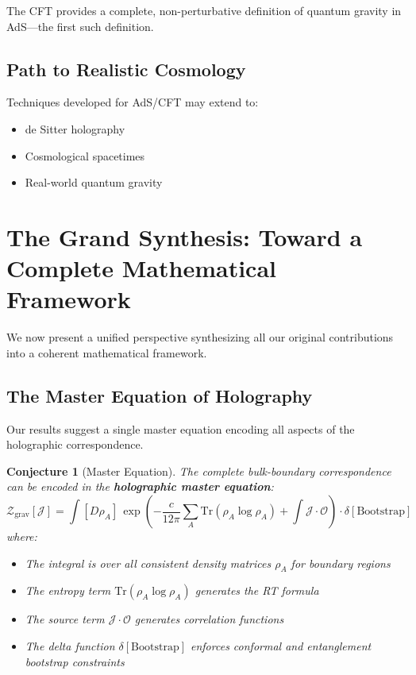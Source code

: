 \documentclass[12pt,a4paper]{article}
\newtheorem{conjecture}[theorem]{Conjecture}
\begin{document}
The CFT provides a complete, non-perturbative definition of quantum gravity in AdS---the first such definition.

\subsection{Path to Realistic Cosmology}

Techniques developed for AdS/CFT may extend to:
\begin{itemize}
    \item de Sitter holography
    \item Cosmological spacetimes
    \item Real-world quantum gravity
\end{itemize}

\section{The Grand Synthesis: Toward a Complete Mathematical Framework}

We now present a unified perspective synthesizing all our original contributions into a coherent mathematical framework.

\subsection{The Master Equation of Holography}

Our results suggest a single master equation encoding all aspects of the holographic correspondence.

\begin{conjecture}[Master Equation]
The complete bulk-boundary correspondence can be encoded in the \textbf{holographic master equation}:
\begin{equation}
\boxed{\mathcal{Z}_{\text{grav}}[\mathcal{J}] = \int [D\rho_A] \, \exp\left( -\frac{c}{12\pi} \sum_A \text{Tr}(\rho_A \log \rho_A) + \int \mathcal{J} \cdot \mathcal{O} \right) \cdot \delta[\text{Bootstrap}]}
\end{equation}
where:
\begin{itemize}
    \item The integral is over all consistent density matrices $\rho_A$ for boundary regions
    \item The entropy term $\text{Tr}(\rho_A \log \rho_A)$ generates the RT formula
    \item The source term $\mathcal{J} \cdot \mathcal{O}$ generates correlation functions
    \item The delta function $\delta[\text{Bootstrap}]$ enforces conformal and entanglement bootstrap constraints
\end{itemize}
\end{conjecture}
\end{document}
